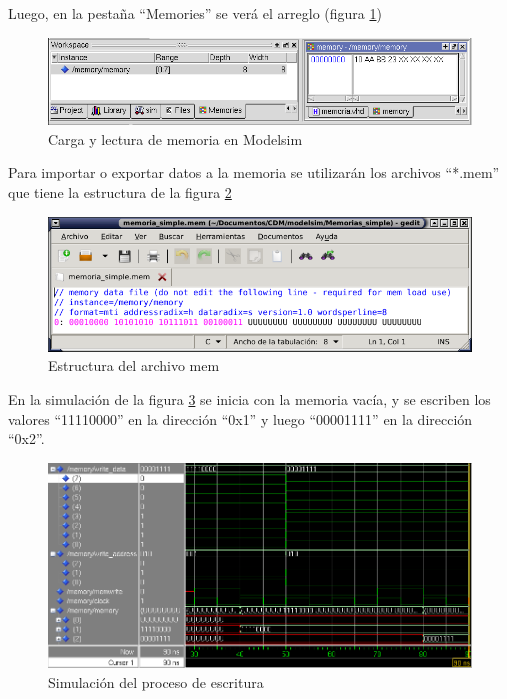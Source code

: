 Luego, en la pestaña ``Memories'' se verá el arreglo (figura \ref{mem2})

\begin{figure}[h]
  \centering
    \includegraphics[width=1\textwidth]{graficos/ms_mem2.png}
  \caption{Carga y lectura de memoria en Modelsim}
  \label{mem2}
\end{figure}

Para importar o exportar datos a la memoria se utilizarán los archivos ``*.mem'' que tiene la
estructura de la figura \ref{mem3}

\begin{figure}[h]
  \centering
    \includegraphics[width=1\textwidth]{graficos/ms_mem3.png}
  \caption{Estructura del archivo mem}
  \label{mem3}
\end{figure}

En la simulación de la figura \ref{mem4} se inicia con la memoria vacía, y se escriben los valores
``11110000'' en la dirección ``0x1'' y luego ``00001111'' en la dirección ``0x2''.

\begin{figure}[]
  \centering
    \includegraphics[width=1\textwidth]{graficos/write.png}
  \caption{Simulación del proceso de escritura}
  \label{mem4}
\end{figure}

